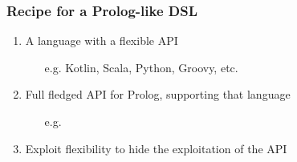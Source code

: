 \documentclass[presentation]{beamer}
\begin{document}
\begin{frame}%
\frametitle{Recipe for a Prolog-like DSL}

    \begin{enumerate}
        \item A language with a flexible API
        \begin{itemize}
            \item[e.g.] Kotlin, Scala, Python, Groovy, etc.
        \end{itemize}

        \vfill

        \item Full fledged API for Prolog, supporting that language
        \begin{itemize}
            \item[e.g.] \twopkt{} 
        \end{itemize}

        \vfill

        \item Exploit flexibility to hide the exploitation of the API
    \end{enumerate}

\end{frame}
\end{document}
